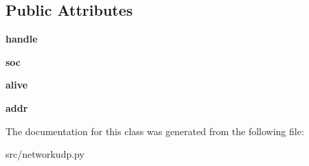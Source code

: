 \subsection*{Public Attributes}
\begin{DoxyCompactItemize}
\item 
\hypertarget{classsrc_1_1networkudp_1_1_network_server_a0d70578d1a6729f81a99b3170c965453}{}\label{classsrc_1_1networkudp_1_1_network_server_a0d70578d1a6729f81a99b3170c965453} 
{\bfseries handle}
\item 
\hypertarget{classsrc_1_1networkudp_1_1_network_server_af2e69f6b7ae8b8492f8f33a1bae2e33b}{}\label{classsrc_1_1networkudp_1_1_network_server_af2e69f6b7ae8b8492f8f33a1bae2e33b} 
{\bfseries soc}
\item 
\hypertarget{classsrc_1_1networkudp_1_1_network_server_ab29e26a5bce9a6086c0644e5299c51c7}{}\label{classsrc_1_1networkudp_1_1_network_server_ab29e26a5bce9a6086c0644e5299c51c7} 
{\bfseries alive}
\item 
\hypertarget{classsrc_1_1networkudp_1_1_network_server_a4bfeb1f98e7ad40ee40c490dcb4ef4fd}{}\label{classsrc_1_1networkudp_1_1_network_server_a4bfeb1f98e7ad40ee40c490dcb4ef4fd} 
{\bfseries addr}
\end{DoxyCompactItemize}


The documentation for this class was generated from the following file\+:\begin{DoxyCompactItemize}
\item 
src/networkudp.\+py\end{DoxyCompactItemize}
